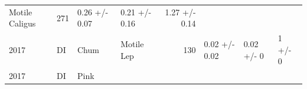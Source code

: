 \documentclass[fleqn,10pt]{wlpeerj} %
\begin{document}
\begin{longtable}[]{@{}llllrlll@{}}
\begin{minipage}[t]{0.11\columnwidth}
Motile Caligus\strut
\end{minipage} & \begin{minipage}[t]{0.04\columnwidth}\raggedleft\strut
271\strut
\end{minipage} & \begin{minipage}[t]{0.14\columnwidth}\raggedright\strut
0.26 +/- 0.07\strut
\end{minipage} & \begin{minipage}[t]{0.14\columnwidth}\raggedright\strut
0.21 +/- 0.16\strut
\end{minipage} & \begin{minipage}[t]{0.14\columnwidth}\raggedright\strut
1.27 +/- 0.14\strut
\end{minipage}\tabularnewline
\begin{minipage}[t]{0.09\columnwidth}\raggedright\strut
2017\strut
\end{minipage} & \begin{minipage}[t]{0.06\columnwidth}\raggedright\strut
DI\strut
\end{minipage} & \begin{minipage}[t]{0.06\columnwidth}\raggedright\strut
Chum\strut
\end{minipage} & \begin{minipage}[t]{0.11\columnwidth}\raggedright\strut
Motile Lep\strut
\end{minipage} & \begin{minipage}[t]{0.04\columnwidth}\raggedleft\strut
130\strut
\end{minipage} & \begin{minipage}[t]{0.14\columnwidth}\raggedright\strut
0.02 +/- 0.02\strut
\end{minipage} & \begin{minipage}[t]{0.14\columnwidth}\raggedright\strut
0.02 +/- 0\strut
\end{minipage} & \begin{minipage}[t]{0.14\columnwidth}\raggedright\strut
1 +/- 0\strut
\end{minipage}\tabularnewline
\begin{minipage}[t]{0.09\columnwidth}\raggedright\strut
2017\strut
\end{minipage} & \begin{minipage}[t]{0.06\columnwidth}\raggedright\strut
DI\strut
\end{minipage} & \begin{minipage}[t]{0.06\columnwidth}\raggedright\strut
Pink\strut
\end{minipage} & \begin{minipage}[t]{0.11\columnwidth}\raggedright\strut

\end{minipage}
\end{longtable}
\end{document}
